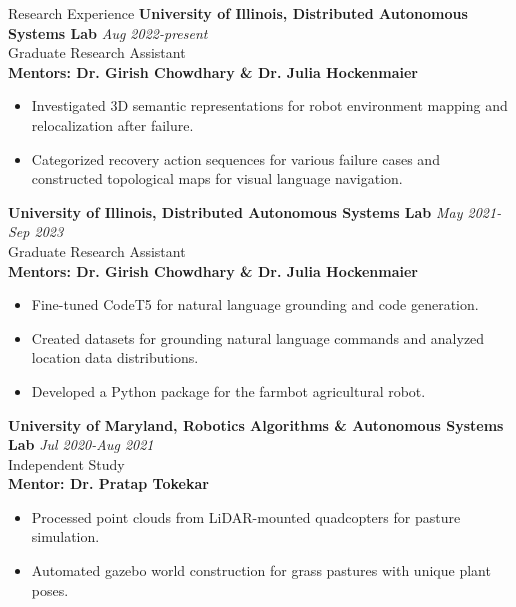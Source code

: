 \documentclass{resume} %
\begin{document}
\begin{rSection}{Research Experience}
    \textbf{University of Illinois, Distributed Autonomous Systems Lab} \hfill \textit{Aug 2022-present}
    \\ Graduate Research Assistant
    \\ \textbf{Mentors: Dr. Girish Chowdhary \& Dr. Julia Hockenmaier}
    \vspace{-0.2cm}
    \begin{itemize}[noitemsep,nolistsep]
        \item Investigated 3D semantic representations for robot environment mapping and relocalization after failure.
        \item Categorized recovery action sequences for various failure cases and constructed topological maps for visual language navigation.
    \end{itemize}
    
    \textbf{University of Illinois, Distributed Autonomous Systems Lab} \hfill \textit{May 2021-Sep 2023}
    \\ Graduate Research Assistant
    \\ \textbf{Mentors: Dr. Girish Chowdhary \& Dr. Julia Hockenmaier}
    \vspace{-0.2cm}
    \begin{itemize}[noitemsep,nolistsep]
        \item Fine-tuned CodeT5 for natural language grounding and code generation.
        \item Created datasets for grounding natural language commands and analyzed location data distributions.
        \item Developed a Python package for the farmbot agricultural robot.
    \end{itemize}
    
    \textbf{University of Maryland, Robotics Algorithms \& Autonomous Systems Lab} \hfill \textit{Jul 2020-Aug 2021}
    \\ Independent Study
    \\ \textbf{Mentor: Dr. Pratap Tokekar}
    \vspace{-0.2cm}
    \begin{itemize}[noitemsep,nolistsep]
        \item Processed point clouds from LiDAR-mounted quadcopters for pasture simulation.
        \item Automated gazebo world construction for grass pastures with unique plant poses.
    \end{itemize}
    

\end{rSection}
\end{document}
